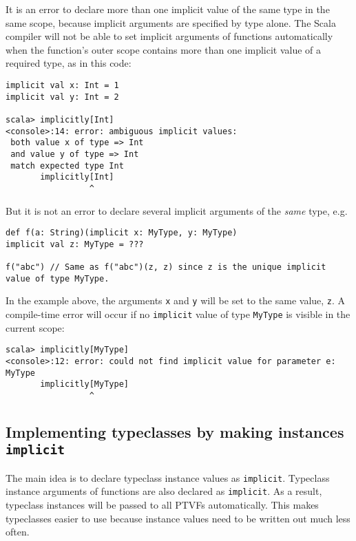 It is an error to declare more than one implicit value of the same
type in the same scope, because implicit arguments are specified by
type alone. The Scala compiler will not be able to set implicit arguments
of functions automatically when the function's outer scope contains
more than one implicit value of a required type, as in this code:
\begin{lstlisting}
implicit val x: Int = 1
implicit val y: Int = 2

scala> implicitly[Int]
<console>:14: error: ambiguous implicit values:
 both value x of type => Int
 and value y of type => Int
 match expected type Int
       implicitly[Int]
                 ^
\end{lstlisting}
But it is not an error to declare several implicit arguments of the
\emph{same} type, e.g.
\begin{lstlisting}
def f(a: String)(implicit x: MyType, y: MyType)
implicit val z: MyType = ???

f("abc") // Same as f("abc")(z, z) since z is the unique implicit value of type MyType.
\end{lstlisting}
In the example above, the arguments \lstinline!x! and \lstinline!y!
will be set to the same value, \lstinline!z!. A compile-time error
will occur if no \lstinline!implicit! value of type \lstinline!MyType!
is visible in the current scope:
\begin{lstlisting}
scala> implicitly[MyType]
<console>:12: error: could not find implicit value for parameter e: MyType
       implicitly[MyType]
                 ^
\end{lstlisting}


\subsection{Implementing typeclasses by making instances \texttt{implicit} }

The main idea is to declare typeclass instance values as \lstinline!implicit!.
Typeclass instance arguments of functions are also declared as \lstinline!implicit!.
As a result, typeclass instances will be passed to all PTVFs automatically.
This makes typeclasses easier to use because instance values need
to be written out much less often.

